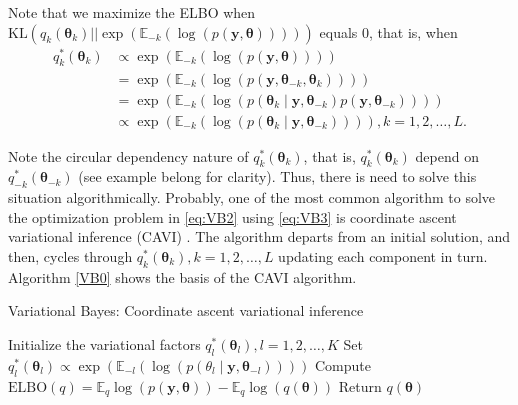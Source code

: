 Note that we maximize the ELBO when $\text{KL}(q_k(\boldsymbol{\theta}_k)||\exp\left(\mathbb{E}_{-k}(\log\left(p(\boldsymbol{y}, \boldsymbol{\theta})\right))\right))$ equals 0, that is, when
\begin{align}\label{eq:VB3}
	q_k^*(\boldsymbol{\theta}_k)&\propto\exp\left(\mathbb{E}_{-k}(\log\left(p(\boldsymbol{y}, \boldsymbol{\theta})\right))\right)\\
	&=\exp\left(\mathbb{E}_{-k}(\log\left(p(\boldsymbol{y}, \boldsymbol{\theta}_{-k},\boldsymbol{\theta}_k)\right))\right)\\
	&=\exp\left(\mathbb{E}_{-k}(\log\left(p({\boldsymbol{\theta}}_{k}\mid\boldsymbol{y},\boldsymbol\theta_{-k})p(\boldsymbol{y},\boldsymbol\theta_{-k})\right))\right)\\
	&\propto \exp\left(\mathbb{E}_{-k}(\log\left(p(\boldsymbol{\theta}_{k}\mid\boldsymbol{y},\boldsymbol\theta_{-k})\right))\right), k=1,2,\dots,L.
\end{align}

Note the circular dependency nature of $q_k^*(\boldsymbol{\theta}_k)$, that is, $q_k^*(\boldsymbol{\theta}_k)$ depend on $q_{-k}^*(\boldsymbol{\theta}_{-k})$ (see example belong for clarity). Thus, there is need to solve this situation algorithmically. Probably, one of the most common algorithm to solve the optimization problem in \ref{eq:VB2} using \ref{eq:VB3} is coordinate ascent variational inference (CAVI) \cite{bishop2006pattern}. The algorithm departs from an initial solution, and then, cycles through $q_k^*(\boldsymbol{\theta}_k), k=1,2,\dots,L$ updating each component in turn. Algorithm \ref{VB0} shows the basis of the CAVI algorithm. 

\begin{algorithm}
	\caption{Variational Bayes: Coordinate ascent variational inference}\label{VB0}
	\begin{algorithmic}[1]
		\State Initialize the variational factors $q_l^*(\boldsymbol{\theta}_l), l=1,2,\dots,K$
				\State Set $q_l^*(\boldsymbol{\theta}_l)\propto \exp\left(\mathbb{E}_{-l}(\log\left(p({\theta}_{l}\mid\boldsymbol{y},\boldsymbol\theta_{-l})\right))\right)$
			\EndFor
		\State Compute $\text{ELBO}(q)=\mathbb{E}_q\log(p(\boldsymbol{y}, \boldsymbol{\theta}))-\mathbb{E}_q\log(q(\boldsymbol{\theta}))$
		\EndWhile 
		\State Return $q(\boldsymbol{\theta})$ 
	\end{algorithmic}
\end{algorithm}
 
